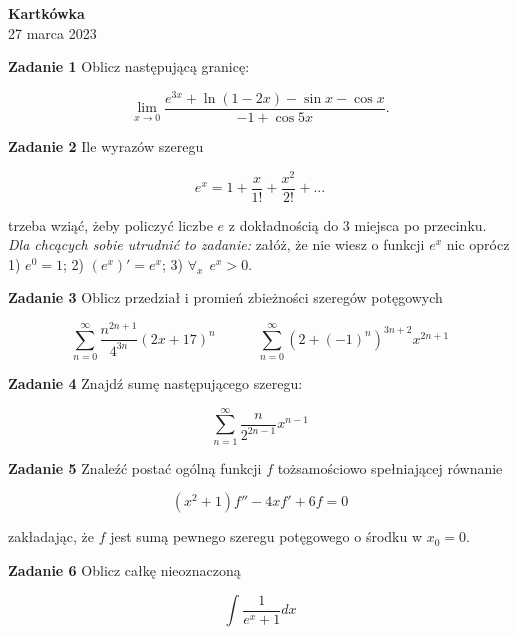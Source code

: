 \documentclass[a4paper,11pt]{article}
\begin{document}
\thispagestyle{empty}

\begin{center}
  {\large\textbf{Kartkówka}}\\
  {\small 27 marca 2023}
\end{center}

\hrulefill

\bigskip

\textbf{Zadanie 1} Oblicz następującą granicę:

\[
\lim_{x \to 0} \frac{e^{3x} + \ln(1-2x) - \sin x - \cos x}{-1 +\cos 5x}
.\]

\bigskip

\textbf{Zadanie 2} Ile wyrazów szeregu 

\[
e^x = 1 + \frac{x}{1!} + \frac{x^2}{2!} + ... 
\]

trzeba wziąć, żeby policzyć liczbe $e$ z dokładnością do 
3 miejsca po przecinku.\\

\textit{Dla chcących sobie utrudnić to zadanie:} załóż, że nie wiesz o 
funkcji $e^x$ nic oprócz 1) $e^0 = 1$; 2) $(e^x)' = e^x$; 
3) $ \forall_x~~e^x > 0$.

\bigskip

\textbf{Zadanie 3} Oblicz przedział i promień zbieżności 
szeregów potęgowych

\[
\sum_{n=0}^\infty \frac{n^{2n+1}}{4^{3n}}(2x+17)^n
\quad\quad\quad
\sum_{n=0}^\infty (2 + (-1)^{n})^{3n+2} x^{2n+1}
\]

\bigskip

\textbf{Zadanie 4} Znajdź sumę następującego szeregu:

$$\sum_{n=1}^\infty \frac{n}{2^{2n-1}} x^{n-1}$$

\bigskip

\textbf{Zadanie 5} Znaleźć postać ogólną funkcji $f$ tożsamościowo
spełniającej równanie

$$(x^2 + 1) f'' - 4x f' + 6f = 0$$

zakładając, że $f$ jest sumą pewnego szeregu potęgowego o środku w 
$x_0 = 0$.

\bigskip

\textbf{Zadanie 6} Oblicz całkę nieoznaczoną

$$\int \frac{1}{e^x + 1} dx$$

\end{document}
